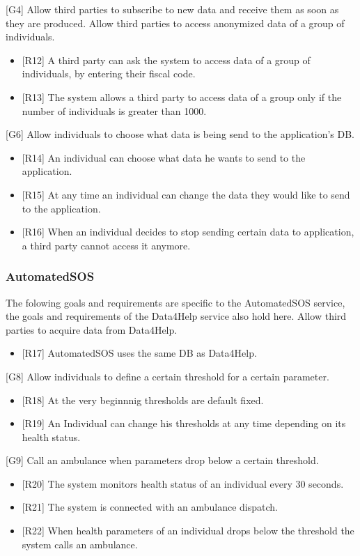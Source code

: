 \documentclass[12pt]{article}
\begin{document}
[G4] Allow third parties to subscribe to new data and receive them as soon as they are produced.\newline
\newpage
[G5] Allow third parties to access anonymized data of a group of individuals.\newline 
\begin{itemize}
    \item {[R12]} A third party can ask the system to access data of a group of individuals, by entering their fiscal code. 
    \item {[R13]} The system allows a third party to access data of a group only if the number of individuals is greater than 1000. 
\end{itemize}
[G6] Allow individuals to choose what data is being send to the application's DB.\newline 
\begin{itemize}
    \item {[R14]} An individual can choose what data he wants to send to the application.
    \item {[R15]} At any time an individual can change the data they would like to send to the application.
    \item {[R16]} When an individual decides to stop sending certain data to application, a third party cannot access it anymore.  
\end{itemize}
\subsubsection{AutomatedSOS}
The folowing goals and requirements are specific to the AutomatedSOS service, the goals and requirements of the Data4Help service also hold here.
\vspace{2mm}
\newline
[G7] Allow third parties to acquire data from Data4Help.\newline 
\begin{itemize} 
    \item {[R17]} AutomatedSOS uses the same DB as Data4Help.
\end{itemize}
[G8] Allow individuals to define a certain threshold for a certain parameter.\newline 
\begin{itemize}
    \item {[R18]} At the very beginnnig thresholds are default fixed.
    \item {[R19]} An Individual can change his thresholds at any time depending on its health status.  
\end{itemize}
[G9] Call an ambulance when parameters drop below a certain threshold.\newline
\begin{itemize}
    \item {[R20]} The system monitors health status of an individual every 30 seconds. 
    \item {[R21]} The system is connected with an ambulance dispatch.
    \item {[R22]} When health parameters of an individual drops below the threshold the system calls an ambulance.
\end{itemize}
\end{document}
